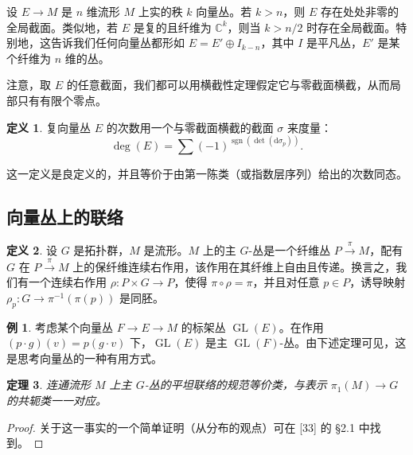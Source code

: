 \documentclass[11pt,a4paper]{article}
\theoremstyle{plain}
\newtheorem{theorem}{定理}[section]
\theoremstyle{definition}
\newtheorem{definition}[theorem]{定义}
\newtheorem*{example}{例}
\begin{document}
设 $E\to M$ 是 $n$ 维流形 $M$ 上实的秩 $k$ 向量丛。若 $k>n$，则 $E$ 存在处处非零的全局截面。类似地，若 $E$ 是复的且纤维为 $\mathbb{C}^k$，则当 $k>n/2$ 时存在全局截面。特别地，这告诉我们任何向量丛都形如 $E=E'\oplus I_{k-n}$，其中 $I$ 是平凡丛，$E'$ 是某个纤维为 $n$ 维的丛。

注意，取 $E$ 的任意截面，我们都可以用横截性定理假定它与零截面横截，从而局部只有有限个零点。

\begin{definition}
复向量丛 $E$ 的次数用一个与零截面横截的截面 $\sigma$ 来度量：
\[
\deg(E)=\sum(-1)^{\operatorname{sgn}(\det(\mathrm{d}\sigma_p))}.
\]
\end{definition}


这一定义是良定义的，并且等价于由第一陈类（或指数层序列）给出的次数同态。

\subsection{向量丛上的联络}

\begin{definition}
设 $G$ 是拓扑群，$M$ 是流形。$M$ 上的主 $G$-丛是一个纤维丛 $P\xrightarrow{\pi}M$，配有 $G$ 在 $P\xrightarrow{\pi}M$ 上的保纤维连续右作用，该作用在其纤维上自由且传递。换言之，我们有一个连续右作用 $\rho\colon P\times G\to P$，使得 $\pi\circ\rho=\pi$，并且对任意 $p\in P$，诱导映射 $\rho_p\colon G\to\pi^{-1}(\pi(p))$ 是同胚。
\end{definition}

\begin{example}
考虑某个向量丛 $F\to E\to M$ 的标架丛 $\operatorname{GL}(E)$。在作用 $(p\cdot g)(v)=p(g\cdot v)$ 下，$\operatorname{GL}(E)$ 是主 $\operatorname{GL}(F)$-丛。由下述定理可见，这是思考向量丛的一种有用方式。
\end{example}

\begin{theorem}
连通流形 $M$ 上主 $G$-丛的平坦联络的规范等价类，与表示 $\pi_1(M)\to G$ 的共轭类一一对应。
\end{theorem}
\begin{proof}
关于这一事实的一个简单证明（从分布的观点）可在 [33] 的 §2.1 中找到。
\end{proof}
\end{document}
